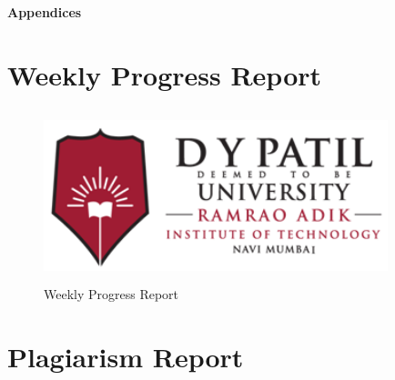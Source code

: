 \documentclass{RAITreport}
\begin{document}


 
 
 
 
 \renewcommand{\bibname}{References}\thispagestyle{plain}
 
 

              
%



\newpage
\begin{center}
	\vspace*{11cm}
	\centering
	{  \huge \bfseries Appendices}
\end{center}

\let\cleardoublepage\clearpage
\appendix
\chapter{Weekly Progress Report}
\begin{figure}[h]
	\centering
	\includegraphics[width=10cm, height=5cm]{rait-dypu-logo.png}
	\caption[Weekly Progress Report]{Weekly Progress Report}
	\label{fig:my_label}
\end{figure}
\newpage
\chapter{Plagiarism Report}\thispagestyle{plain}
%
\newpage
\end{document}
